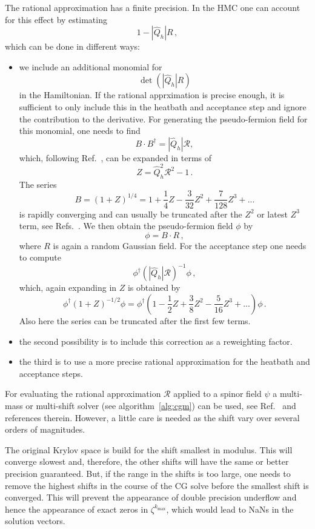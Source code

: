 The rational approximation has a finite precision. In the HMC one can
account for this effect by estimating
\[
1 - |\hat Q_h| R\,,
\]
which can be done in different ways:
\begin{itemize}
\item we include an additional monomial for
  \[
  \det (|\hat Q_h| R)
  \]
  in the Hamiltonian. If the rational apprximation is precise enough,
  it is sufficient to only include this in the heatbath and acceptance
  step and ignore the contribution to the derivative. For generating
  the pseudo-fermion field for this monomial, one needs to find
  \[
  B\cdot B^\dagger = |\hat Q_h| \mathcal{R},
  \]
  which, following Ref.~\cite{Luscher:2010ae}, can be expanded in
  terms of
  \[
  Z = \hat Q_h^2\mathcal{R}^2 -1\,.
  \]
  The series
  \[
  B = (1+Z)^{1/4} =  1 + \frac{1}{4} Z - \frac{3}{32} Z^2 + \frac{7}{128} Z^3 + ...
  \]
  is rapidly converging and can usually be truncated after the $Z^2$
  or latest $Z^3$ term, see
  Refs.~\cite{Luscher:2010ae,Luscher:2012av}. We then obtain the
  pseudo-fermion field $\phi$ by
  \[
  \phi = B\cdot R\,,
  \]
  where $R$ is again a random Gaussian field. For the acceptance step
  one needs to compute
  \[
  \phi^\dagger (|\hat Q_h|\mathcal{R})^{-1}\phi\,,
  \]
  which, again expanding in $Z$ is obtained by
  \[
  \phi^\dagger (1+Z)^{-1/2} \phi = \phi^\dagger (1 - \frac{1}{2}Z +
  \frac{3}{8}Z^2 - \frac{5}{16}Z^3 + ...) \phi\, .
  \]
  Also here the series can be truncated after the first few terms.
\item the second possibility is to include this correction as a
  reweighting factor.
\item the third is to use a more precise rational approximation for
  the heatbath and acceptance steps.
\end{itemize}

For evaluating the rational approximation $\mathcal{R}$ applied to a
spinor field $\psi$ a multi-mass or multi-shift solver (see
algorithm~\ref{alg:cgm}) can be used, see Ref.~\cite{Chiarappa:2006hz}
and references therein. However, a little care is needed
as the shift vary over several orders of magnitudes.

The original Krylov space is build for the shift smallest in
modulus. This will converge slowest and, therefore, the other shifts
will have the same or better precision guaranteed. But, if the
range in the shifts is too large, one needs to remove the highest
shifts in the course of the CG solve before the smallest shift is
converged. This will prevent the appearance of double precision
underflow and hence the appearance of exact zeros in
$\zeta^{k_\mathrm{max}}$, which would lead to 
NaNs in the solution vectors.

